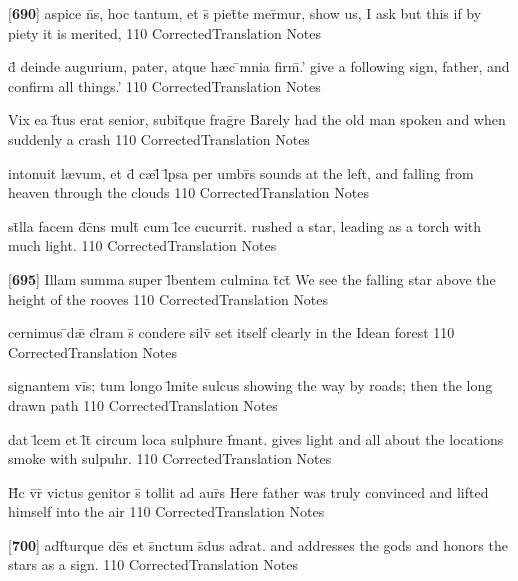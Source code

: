 \latline
  {[\textbf{690}] aspice n\={}s, hoc tantum, et s\={\macron {\i}} piet\={}te mer\={}mur,}
  { show us, I ask but this if by piety it is merited, }
  {110}
  { CorrectedTranslation }
  { Notes }


\latline
  {d\={} deinde augurium, pater, atque h{\ae}c \={}mnia firm\={}.'}
  { give a following sign, father, and confirm all things.' }
  {110}
  { CorrectedTranslation }
  { Notes }


\latline
  {Vix ea f\={}tus erat senior, subit\={}que frag\={}re}
  { Barely had the old man spoken and when suddenly a crash }
  {110}
  { CorrectedTranslation }
  { Notes }


\latline
  {intonuit l{\ae}vum, et d\={} c{\ae}l\={} l\={}psa per umbr\={}s}
  { sounds at the left, and falling from heaven through the clouds }
  {110}
  { CorrectedTranslation }
  { Notes }


\latline
  {st\={}lla facem d\={}c\={}ns mult\={} cum l\={}ce cucurrit.}
  { rushed a star, leading as a torch with much light. }
  {110}
  { CorrectedTranslation }
  { Notes }


\latline
  {[\textbf{695}] Illam summa super l\={}bentem culmina t\={}ct\={\macron {\i}}}
  { We see the falling star above the height of the rooves }
  {110}
  { CorrectedTranslation }
  { Notes }


\latline
  {cernimus \={}d{\ae}\={} cl\={}ram s\={} condere silv\={}}
  { set itself clearly in the Idean forest }
  {110}
  { CorrectedTranslation }
  { Notes }


\latline
  {signantem vi\={}s; tum longo l\={\macron {\i}}mite sulcus}
  { showing the way by roads; then the long drawn path }
  {110}
  { CorrectedTranslation }
  { Notes }


\latline
  {dat l\={}cem et l\={}t\={} circum loca sulphure f\={}mant.}
  { gives light and all about the locations smoke with sulpuhr. }
  {110}
  { CorrectedTranslation }
  { Notes }


\latline
  {H\={\macron {\i}}c v\={}r\={} victus genitor s\={} tollit ad aur\={}s}
  { Here father was truly convinced and lifted himself into the air }
  {110}
  { CorrectedTranslation }
  { Notes }


\latline
  {[\textbf{700}] adf\={}turque de\={}s et s\={}nctum s\={\macron {\i}}dus ad\={}rat.}
  { and addresses the gods and honors the stars as a sign. }
  {110}
  { CorrectedTranslation }
  { Notes }


